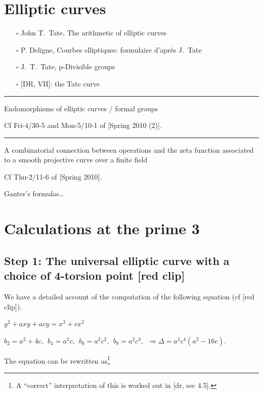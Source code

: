 \documentclass{rs}
\theoremstyle{definition}
\theoremstyle{remark}
\renewcommand{\=}{\approx}
\renewcommand{\-}{\sim}
\numberwithin{equation}{section}
\numberwithin{thm}{section}
\begin{document}
\newpage
\section{Elliptic curves}

\begin{itemize}
 \item [$\scriptscriptstyle\square$] John T.~Tate, The arithmetic of elliptic curves 

 \item [$\scriptscriptstyle\square$] P. Deligne, Courbes elliptiques: formulaire d'apr\`es J.~Tate 

 \item [$\scriptscriptstyle\square$] J.~T.~Tate, p-Divisible groups 

 \item [$\scriptscriptstyle\square$] [DR, VII]: the Tate curve \\
\end{itemize}

\hrule

Endomorphisms of elliptic curves / formal groups

Cf Fri-4/30-5 and Mon-5/10-1 of [Spring 2010 (2)].\\

\hrule

A combinatorial connection between operations and the zeta function associated to a smooth projective curve over a finite field

Cf Thu-2/11-6 of [Spring 2010].

Ganter's formulas\ldots 


\newpage
\section{Calculations at the prime 3}
\subsection{Step 1: The universal elliptic curve with a choice of 4-torsion point [red clip]}

We have a detailed account of the computation of the following equation (cf [red clip]).

\centerline{$y^2 + a x y + a c y = x^3 + c x^2$}

$b_2 = a^2 + 4c,~~ b_4 = a^2 c,~~ b_6 = a^2 c^2,~~ b_8 = a^2 c^3,~~ \Rightarrow \Delta = a^2 c^4 (a^2 - 16c)$.

The equation can be rewritten as\footnote{A ``correct'' interpretation of this is worked out in [dr, sec 4.5].  } 
\end{document}
